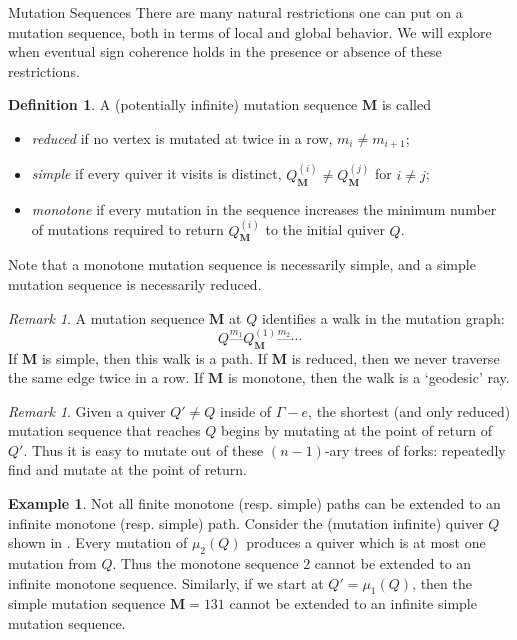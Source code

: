 \documentclass[12pt]{amsart}
\makeatletter
\theoremstyle{definition}
\newtheorem{defn}[thm]{Definition}
\newtheorem{exmp}[thm]{Example}
\theoremstyle{remark}
\newtheorem{rem}[thm]{Remark}
\numberwithin{equation}{section}
\def\subsection{\@startsection{subsection}{3}%
  \z@{.5\linespacing\@plus.7\linespacing}{.1\linespacing}%
  {\bfseries}}
\makeatother
\begin{document}
\subsection{Mutation Sequences}
There are many natural restrictions one can put on a mutation sequence, both in terms of local and global behavior.  We will explore when eventual sign coherence holds in the presence or absence of these restrictions. 

\begin{defn}
A (potentially infinite) mutation sequence $\mathbf M$ is called 
\begin{itemize}
    \item \emph{reduced} if no vertex is mutated at twice in a row, $m_i \neq m_{i+1}$;
    \item \emph{simple} if every quiver it visits is distinct, $Q^{(i)}_{\mathbf M} \neq Q^{(j)}_{\mathbf M}$ for $i \neq j$; 
    \item \emph{monotone} if every mutation in the sequence increases the minimum number of mutations required to return $Q^{(i)}_{\mathbf M}$ to the initial quiver $Q$.
\end{itemize}
\end{defn}

Note that a monotone mutation sequence is necessarily simple, and a simple mutation sequence is necessarily reduced.

\begin{rem}
A mutation sequence $\mathbf M$ at $Q$ identifies a walk in the mutation graph:
$$ Q \stackrel{m_1}{\text{---}} Q^{(1)}_{\mathbf M} \stackrel{m_2}{\text{---}} \cdots$$
If $\mathbf M$ is simple, then this walk is a path. 
If $\mathbf M$ is reduced, then we never traverse the same edge twice in a row. 
If $\mathbf M$ is monotone, then the walk is a `geodesic' ray.
\end{rem}



\begin{rem}
Given a quiver $Q' \neq Q$ inside of $\Gamma - e$, the shortest (and only reduced) mutation sequence that reaches $Q$ begins by mutating at the point of return of $Q'$. 
Thus it is easy to mutate out of these $(n-1)$-ary trees of forks: 
repeatedly find and mutate at the point of return.
\end{rem}


\begin{exmp}
\label{eg: dead end}
Not all finite monotone (resp. simple) paths can be extended to an infinite monotone (resp. simple) path. Consider the (mutation infinite) quiver $Q$ shown in .
Every mutation of $\mu_2(Q)$ produces a quiver which is at most one mutation from $Q$. Thus the monotone sequence $2$ cannot be extended to an infinite monotone sequence.
Similarly, if we start at $Q'=\mu_1(Q)$, then the simple mutation sequence $\mathbf{M} = 131$ cannot be extended to an infinite simple mutation sequence.
\end{exmp}
\end{document}
